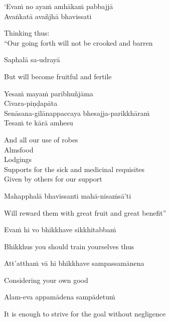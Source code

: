 ‘Evaṁ no ayaṁ amhākaṁ pabbajjā\\
Avaṅkatā avañjhā
bhavissati

\begin{english}
  Thinking thus:\\
  “Our going forth will not be crooked and barren
\end{english}

Saphalā sa-udrayā

\begin{english}
  But will become fruitful and fertile
\end{english}

Yesaṁ mayaṁ paribhuñjāma\\
Cīvara-piṇḍapāta\\
Senāsana-gilānappaccaya bhesajja-parikkhāraṁ\\
Tesaṁ te kārā amhesu

\begin{english}
  And all our use of robes\\
  Almsfood\\
  Lodgings\\
  Supports for the sick and medicinal requisites\\
  Given by others for our support
\end{english}

Mahapphalā bhavissanti mahā-nisaṁsā'ti

\begin{english}
  Will reward them with great fruit and great benefit”
\end{english}

Evaṁ hi vo bhikkhave sikkhitabbaṁ

\begin{english}
  Bhikkhus you should train yourselves thus
\end{english}

Att’atthaṁ vā hi bhikkhave sampassamānena

\begin{english}
  Considering your own good
\end{english}

Alam-eva appamādena sampādetuṁ

\begin{english}
  It is enough to strive for the goal without negligence
\end{english}

